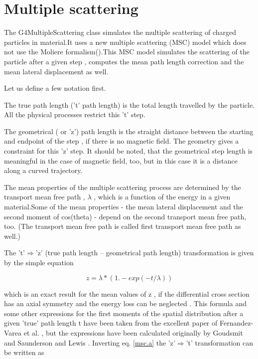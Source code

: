  \chapter[Multiple scattering]{Multiple scattering}

 The G4MultipleScattering class simulates the multiple scattering of
charged particles  in material.It uses a new multiple scattering (MSC)
model which  does not use the
Moliere formalism(\cite{msc.moliere}).This MSC model simulates the scattering of the 
particle after a given step , computes the mean path length 
correction and the mean lateral displacement as well.

 Let us define a few notation first.

 The true path length ('t' path length) is the total length travelled
by the particle. All the physical processes restrict this 't' step.

 The geometrical ( or 'z') path length is the straight distance between
the starting and endpoint of the step , if there is no magnetic field.
The geometry gives a constraint for this 'z' step. It should be noted,
that the geometrical step length is meaningful in the case of magnetic
field, too, but in this case it is a distance along a curved 
trajectory.

 The mean properties of the multiple scattering process are determined
by the transport mean free path , \(\lambda\) , which is a function of the 
energy in a given material.Some of the mean properties - the mean lateral
 displacement and the second moment of cos(theta) - depend on the second
 transport mean free path, too. (The transport mean free path is called
 first transport mean free path as well.)

  The 't'\(\Rightarrow\)'z' (true path length -- geometrical path length) transformation is given by the simple equation

   \begin{equation}
         z = \lambda*(1.-exp(-t/\lambda))                \label{msc.a}
   \end{equation}

 which is an exact result for the mean values of z , if
the differential cross section has an axial symmetry and the energy loss
can be neglected .
  This formula and some other expressions for the first moments of the spatial
distribution after a given 'true' path length t have been taken from the excellent
paper of Fernandez-Varea et al. \cite{msc.fernandez}, but the expressions have been
calculated originally by Goudsmit and Saunderson \cite{msc.goudsmit} and Lewis
\cite{msc.lewis}.
  Inverting eq. \ref{msc.a} the 'z'\(\Rightarrow\)'t' transformation can be written as

